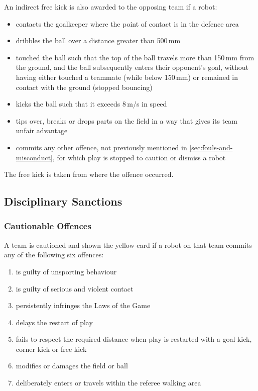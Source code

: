 An indirect free kick is also awarded to the opposing team if a robot:
\begin{itemize}
\item contacts the goalkeeper where the point of contact is in the defence area
\item dribbles the ball over a distance greater than 500\,mm
\item touched the ball such that the top of the ball travels more than 150\,mm from the ground, and the ball subsequently enters their opponent's goal, without having either touched a teammate (while below 150\,mm) or remained in contact with the ground (stopped bouncing)
\item kicks the ball such that it exceeds 8\,m/s in speed
\item tips over, breaks or drops parts on the field in a way that gives its team unfair advantage
\item commits any other offence, not previously mentioned in \autoref{sec:fouls-and-misconduct}, for which play is stopped to caution or dismiss a robot
\end{itemize}

The free kick is taken from where the offence occurred.

\subsection{Disciplinary Sanctions}\label{subsec:fouls-and-misconduct-disciplinary-sanctions}
\subsubsection{Cautionable Offences}
A team is cautioned and shown the yellow card if a robot on that team commits any of the following six offences:
\begin{enumerate}
\item is guilty of unsporting behaviour
\item is guilty of serious and violent contact
\item persistently infringes the Laws of the Game
\item delays the restart of play
\item fails to respect the required distance when play is restarted with a goal kick, corner kick or free kick
\item modifies or damages the field or ball
\item deliberately enters or travels within the referee walking area
\end{enumerate}


